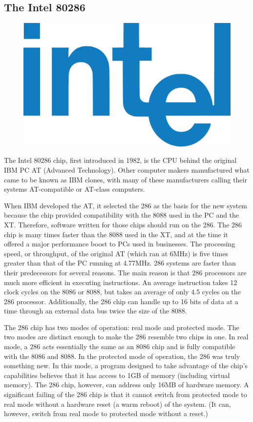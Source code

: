 \documentclass[book.tex]{subfiles}
\begin{document}
\subsection{The Intel 80286}
  \begin{figure}
\centering
\vspace{-10pt}
\includegraphics[width=.3\textwidth]{imgs/drawings/intel_logo.eps}
\end{figure}
\par
The Intel 80286 chip, first introduced in 1982, is the CPU behind the original IBM PC AT (Advanced Technology). Other computer makers manufactured what came to be known as IBM clones, with many of these manufacturers calling their systems AT-compatible or AT-class computers. \\
\par
When IBM developed the AT, it selected the 286 as the basis for the new system because the chip provided compatibility with the 8088 used in the PC and the XT. Therefore, software written for those chips should run on the 286. The 286 chip is many times faster than the 8088 used in the XT, and at the time it offered a major performance boost to PCs used in businesses. The processing speed, or throughput, of the original AT (which ran at 6MHz) is five times greater than that of the PC running at 4.77MHz.
286 systems are faster than their predecessors for several reasons. The main reason is that 286 processors are much more efficient in executing instructions. An average instruction takes 12 clock cycles on the 8086 or 8088, but takes an average of only 4.5 cycles on the 286 processor. Additionally, the 286 chip can handle up to 16 bits of data at a time through an external data bus twice the size of the 8088.\\
\par
The 286 chip has two modes of operation: real mode and protected mode. The two modes are distinct enough to make the 286 resemble two chips in one. In real mode, a 286 acts essentially the same as an 8086 chip and is fully compatible with the 8086 and 8088. In the protected mode of operation, the 286 was truly something new. In this mode, a program designed to take advantage of the chip's capabilities believes that it has access to 1GB of memory (including virtual memory). The 286 chip, however, can address only 16MB of hardware memory. A significant failing of the 286 chip is that it cannot switch from protected mode to real mode without a hardware reset (a warm reboot) of the system. (It can, however, switch from real mode to protected mode without a reset.)\\
\end{document}
